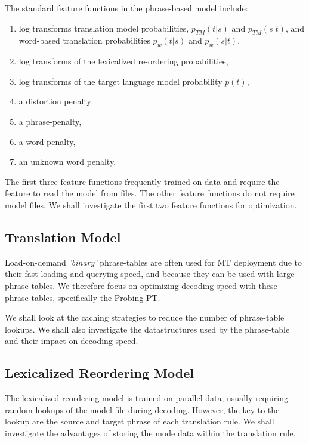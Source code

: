\documentclass[11pt]{article}
\begin{document}
The standard feature functions in the phrase-based model include:
\begin{enumerate}
  \item log transforms translation model probabilities, $p_{TM}(t|s) $ and $p_{TM}(s|t)$, and word-based translation probabilities $p_w(t|s)$ and $p_w(s|t)$,
  \item log transforms of the lexicalized re-ordering probabilities,
  \item log transforms of the target language model probability $p(t)$, 
  \item a distortion penalty
  \item a phrase-penalty,
  \item a word penalty,
  \item an unknown word penalty.
\end{enumerate}

The first three feature functions frequently trained on data and require the feature to read the model from files. The other feature functions do not require model files. We shall investigate the first two feature functions for optimization.

%
\subsection{Translation Model}

Load-on-demand \emph{'binary'} phrase-tables are often used for MT deployment due to their fast loading and querying speed, and because they can be used with large phrase-tables. We therefore focus on optimizing decoding speed with these phrase-tables, specifically the Probing PT.

We shall look at the caching strategies to reduce the number of phrase-table lookups. We shall also investigate the datastructures used by the phrase-table and their impact on decoding speed.

\subsection{Lexicalized Reordering Model}

The lexicalized reordering model is trained on parallel data, usually requiring random lookups of the model file during decoding. However, the key to the lookup are the source and target phrase of each translation rule. We shall investigate the advantages of storing the mode data within the translation rule.
\end{document}
